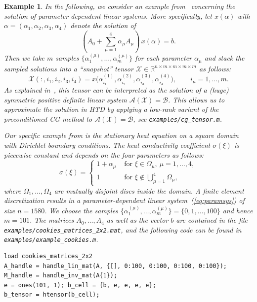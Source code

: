 \documentclass[11pt, a4paper]{article}
\newcommand{\calA}{\mathcal{A}}
\newcommand{\calB}{\mathcal{B}}
\newcommand{\calX}{\mathcal{X}}
\newcommand{\R}{{\mathbb R}}
\newtheorem{example}[theorem]{\bf Example}
\begin{document}
\begin{example} \rm
  \label{example:cookies}
In the following, we consider an example from~\cite{KreT10b}
concerning the solution of parameter-dependent linear systems.
More specifically, let $x(\alpha)$ with $\alpha = (\alpha_1,\alpha_2,\alpha_3,\alpha_4)$ denote the solution of
\begin{equation} \label{eq:paramsys}
\left(A_0 + \sum_{\mu=1}^4 \alpha_\mu A_\mu\right) \, x(\alpha) = b.
\end{equation}
Then we take $m$ samples $\{ \alpha^{(\mu)}_1, \ldots, \alpha^{(\mu)}_m \}$ for each parameter $\alpha_{\mu}$ and stack the sampled solutions into
a ``snapshot'' tensor $\calX \in \R^{n \times m \times m \times m \times m}$ as follows:
\[
 \calX(:, i_1, i_2, i_3, i_4) = x\Big(\alpha^{(1)}_{i_1}, \alpha^{(2)}_{i_2}, \alpha^{(3)}_{i_3}, \alpha^{(4)}_{i_4} \Big), \qquad i_\mu = 1,\ldots,m.
\]
As explained in~\cite{KreT10b}, this tensor can be interpreted as the solution of a (huge) symmetric positive definite linear system $\calA(\calX) = \calB$. This allows us to approximate the solution in HTD
by applying a low-rank variant of the preconditioned CG
method to $\calA(\calX) = \calB$, see \texttt{examples/cg\_tensor.m}.

Our specific example from \cite[Sec. 4]{KreT10b} is the stationary heat equation on a square domain with Dirichlet boundary conditions. The heat conductivity coefficient $\sigma(\xi)$ is piecewise constant and depends on the four parameters as follows:
\[
\sigma(\xi) = 
\left\{ \begin{array}{cl}
1 + \alpha_\mu  & \text{ for } \xi \in \Omega_\mu,\ \mu = 1,\ldots, 4,\\
1             & \text{ for } \xi \notin \bigcup_{\mu=1}^4 \Omega_\mu,
\end{array} \right.
\]
where $\Omega_1, \ldots, \Omega_4$ are mutually disjoint discs inside
the domain. A finite element discretization results in a
parameter-dependent linear system~(\ref{eq:paramsys}) of size $n =
1580$. We choose the samples $\{ \alpha^{(\mu)}_1, \ldots,
\alpha^{(\mu)}_m \} = \{ 0, 1, \ldots, 100 \}$ and hence $m =
101$. The matrices $A_0, \ldots, A_4$ as well as the vector $b$ are contained in the file \texttt{examples/cookies\_matrices\_2x2.mat}, and the following code can be found in \texttt{examples/example\_cookies.m}.
\begin{framed}\small \noindent
\vspace{-3ex} 
\begin{verbatim}
load cookies_matrices_2x2
A_handle = handle_lin_mat(A, {[], 0:100, 0:100, 0:100, 0:100});
M_handle = handle_inv_mat(A{1});
e = ones(101, 1); b_cell = {b, e, e, e, e};
b_tensor = htensor(b_cell);


\end{verbatim}
\end{framed}
\end{example}
\end{document}
